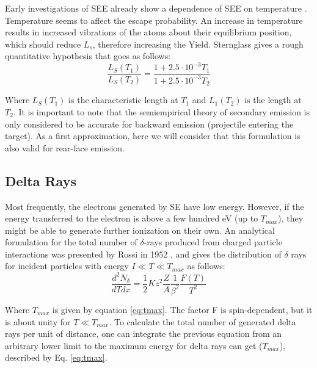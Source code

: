 Early investigations of SEE already show a dependence of SEE on temperature \parencite*[][]{ref:SeyVsTemp}. Temperature seems to affect the escape probability. An increase in temperature results in increased vibrations of the atoms about their equilibrium position, which should reduce $L_{s}$, therefore increasing the Yield. Sternglass gives a rough quantitative hypothesis that goes as follows: 
\begin{equation}
    \frac{L_S (T_1)}{L_S(T_2)} = \frac{1+2.5\cdot 10^{-3}T_1}{1+2.5\cdot 10^{-3}T_2}
\end{equation}

Where $L_{S}(T_{1})$ is the characteristic length at $T_{1}$ and $L_{1}(T_{2})$ is the length at $T_{2}$. It is important to note that the semiempirical theory of secondary emission is only considered to be accurate for backward emission (projectile entering the target). As a first approximation, here we will consider that this formulation is also valid for rear-face emission. 

\subsection{Delta Rays}

Most frequently, the electrons generated by SE have low energy. However, if the energy transferred to the electron is above a few hundred \si[]{\electronvolt} (up to $T_{max}$), they might be able to generate further ionization on their own. An analytical formulation for the total number of $\delta$-rays produced from charged particle interactions was presented by Rossi in 1952 \parencite*[][]{ref:delta1}, and gives the distribution of $\delta$ rays for incident particles with energy $I \ll T \ll T_{max}$ as follows: 
\begin{equation}
    \frac{d^2N_{\delta}}{dTdx} = \frac{1}{2}Kz^2\frac{Z}{A}\frac{1}{\beta^2}\frac{F(T)}{T^2}
    \label{eq:deltaN}
\end{equation}

Where $T_{max}$ is given by equation \ref{eq:tmax}. The factor F is spin-dependent, but it is about unity for $ T \ll  T_{max}$. To calculate the total number of generated delta rays per unit of distance, one can integrate the previous equation from an arbitrary lower limit to the maximum energy for delta rays can get ($T_{max}$), described by Eq. \ref{eq:tmax}. 

